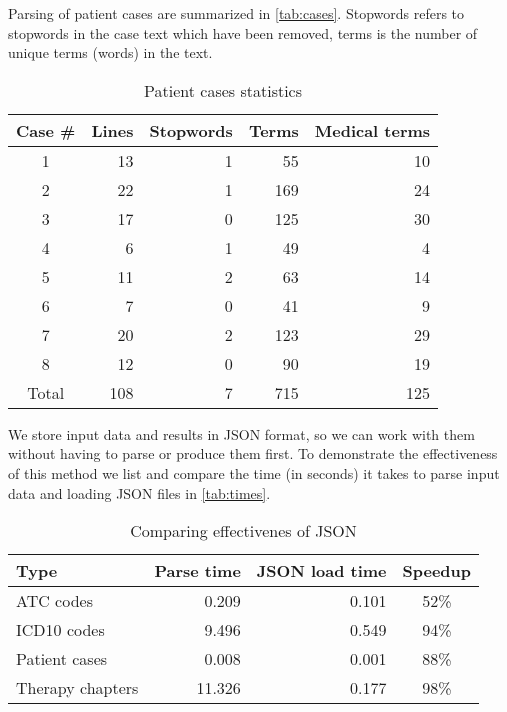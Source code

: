 Parsing of patient cases are summarized in \autoref{tab:cases}. Stopwords
refers to stopwords in the case text which have been removed, terms is the
number of unique terms (words) in the text.
\begin{table}[htbp] \footnotesize \center
\caption{Patient cases statistics\label{tab:cases}}
\begin{tabular}{c r r r r}
    \toprule
	Case \# & Lines & Stopwords & Terms & Medical terms \\
    \midrule
	1 & 13 & 1 & 55 & 10 \\
	2 & 22 & 1 & 169 & 24 \\
	3 & 17 & 0 & 125 & 30 \\
	4 & 6 & 1 & 49 & 4 \\
	5 & 11 & 2 & 63 & 14 \\
	6 & 7 & 0 & 41 & 9 \\
	7 & 20 & 2 & 123 & 29 \\
	8 & 12 & 0 & 90 & 19 \\
    \midrule
	Total & 108 & 7 & 715 & 125 \\
	\bottomrule
\end{tabular}
\end{table}

We store input data and results in JSON format, so we can work with them
without having to parse or produce them first. To demonstrate the
effectiveness of this method we list and compare the time (in seconds) it
takes to parse input data and loading JSON files in \autoref{tab:times}.
\begin{table}[htbp] \footnotesize \center
\caption{Comparing effectivenes of JSON\label{tab:times}}
\begin{tabular}{l r r c}
    \toprule
    Type & Parse time & JSON load time & Speedup \\
    \midrule
	ATC codes & 0.209 & 0.101 & 52\% \\
	ICD10 codes & 9.496 & 0.549 & 94\% \\
	Patient cases & 0.008 & 0.001 & 88\% \\
	Therapy chapters & 11.326 & 0.177 & 98\% \\
	\bottomrule
\end{tabular}
\end{table}


